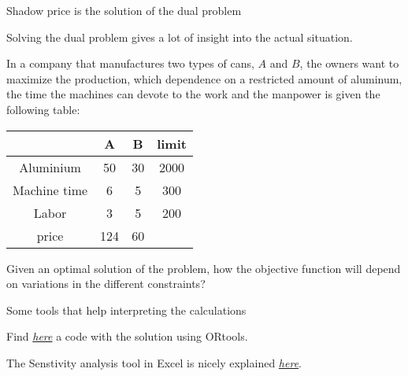 \documentclass[c]{beamer}
\begin{document}

\begin{frame}{Shadow price is the solution of the dual problem}

  Solving the dual problem gives a lot of insight into the actual situation.

  \begin{Exercise}
  In a company that manufactures two types of cans, $A$ and $B$, the owners want to maximize the production, which dependence on a restricted amount of aluminum, the time the machines can devote to the work and the manpower is given the following table:
  \begin{center}
  \begin{tabular}{c|c|c|c}
   & A & B & limit\\
   \hline
   Aluminium & 50 & 30 & 2000\\
    Machine time & 6 & 5 & 300\\
    Labor & 3 & 5 &200\\
   \hline
   price & 124 & 60 & \\
  \end{tabular}
  \end{center}


  Given an optimal solution of the problem, how the objective function will depend on variations in the different constraints?
  \end{Exercise}

\end{frame}

\begin{frame}{Some tools that help interpreting the calculations}

  Find \href{https://github.com/JordiVillaFreixa/ORcode/blob/main/linear_programming.py}{\em here} a code with the solution using ORtools.

  The Senstivity analysis tool in Excel is nicely explained \href{https://www.youtube.com/watch?v=zKqU5NGE-t0&list=PLjiMsqjDUvBiArYMqCGZSDJNgEMPALdQu&index=1}{\em here}.

\end{frame}



\end{document}
